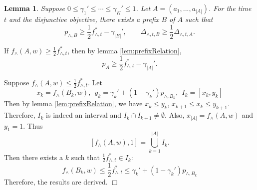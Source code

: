 \documentclass{article}
\newcommand{\abs}[1]{\left| #1 \right|}
\newtheorem{lemma}[theorem]{Lemma}%
\newenvironment{proof}{\noindent {\textbf{Proof. }}}{$\Box$ \medskip}
\begin{document}
\begin{lemma}
Suppose $0 \leq \gamma_1' \leq \cdots \leq \gamma_K' \leq 1$. Let $A = (a_1, ..., a_{\abs{A}})$. For the time $t$ and the disjunctive objective, there exists a prefix $B$ of $A$ such that 
$$
p_{\wedge, B} \geq \frac{1}{2}f_{\wedge, t}^{\ast} - \gamma_{\abs{B}}', \qquad \Delta_{\wedge, t, B} \geq \frac{1}{2}\Delta_{\wedge, t, A}.
$$ 
\end{lemma}
\begin{proof}
If $f_{\wedge}(A, w) \geq \frac{1}{2} f_{\wedge, t}^{\ast}$, then by lemma \ref{lem:prefixRelation},
$$
p_{A} \geq \frac{1}{2}f_{\wedge, t}^{\ast} - \gamma_{\abs{A}}'.
$$

Suppose $f_{\wedge}(A, w) \leq \frac{1}{2} f_{\wedge, t}^{\ast}$. Let
$$
x_k = f_{\wedge}(B_k,w), ~~ y_k = \gamma_k' + (1 - \gamma_k')p_{\wedge, B_k}, ~~I_k = [x_k, y_k]
$$
Then by lemma \ref{lem:prefixRelation}, we have $x_k \leq y_k$, $x_{k+1} \leq x_k \leq y_{k+1}$. Therefore, $I_k$ is indeed an interval and $I_k \cap I_{k+1} \neq \emptyset$. Also, $x_{\abs{A}} = f_{\wedge}(A, w)$ and $y_1 = 1$. Thus
$$
[f_{\wedge}(A,w), 1] = \bigcup_{k=1}^{\abs{A}} I_k.
$$
Then there exists a $k$ such that $\frac{1}{2}f_{\wedge, t}^{\ast} \in I_k$:
$$
f_{\wedge}(B_k,w) \leq \frac{1}{2}f_{\wedge, t}^{\ast} \leq \gamma_k' + (1 - \gamma_k')p_{\wedge, B_k}
$$
Therefore, the results are derived.
\end{proof}
\end{document}
